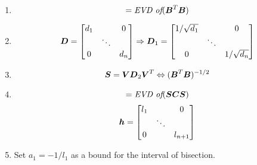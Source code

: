 \begin{enumerate}
\item \begin{equation*}
[\BV, \BD] = \textit{EVD of} (\BB^T\BB)
\end{equation*}
\item \begin{equation*}
\mbox{\boldmath$D$} = \begin{bmatrix}
d_1 & & 0 \\
 & \ddots & \\
0 & & d_n
\end{bmatrix} \Rightarrow \mbox{\boldmath$D$}_1 = \begin{bmatrix}
1/\sqrt{d_1} & & 0 \\
 & \ddots & \\
0 & & 1/\sqrt{d_n}
\end{bmatrix}
\end{equation*}
\item \begin{equation*}
\mbox{\boldmath$S$} = \mbox{\boldmath$V$}\mbox{\boldmath$D$}_2\mbox{\boldmath$V$}^T \Leftrightarrow (\mbox{\boldmath$B$}^T\mbox{\boldmath$B$})^{-1/2}
\end{equation*}
\item \begin{equation*}
[\BV, \Bh] = \textit{EVD of} (\BS\BC\BS)
\end{equation*}
\begin{equation*}
\mbox{\boldmath$h$} = \begin{bmatrix}
l_1 & & 0 \\
 & \ddots & \\
0 & & l_{n+1}
\end{bmatrix}
\end{equation*}
\item Set $a_1 = -1/l_1$ as a bound for the interval of bisection.
\end{enumerate}

